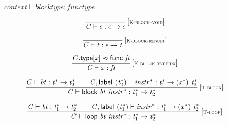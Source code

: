 \vspace{1ex}

$\boxed{{\mathit{context}} \vdash {\mathit{blocktype}} : {\mathit{functype}}}$

$$
\begin{array}{@{}c@{}}\displaystyle
\frac{
}{
{\mathit{C}} \vdash \epsilon : \epsilon \rightarrow \epsilon
} \, {[\textsc{\scriptsize K{-}block{-}void}]}
\qquad
\end{array}
$$

$$
\begin{array}{@{}c@{}}\displaystyle
\frac{
}{
{\mathit{C}} \vdash {\mathit{t}} : \epsilon \rightarrow {\mathit{t}}
} \, {[\textsc{\scriptsize K{-}block{-}result}]}
\qquad
\end{array}
$$

$$
\begin{array}{@{}c@{}}\displaystyle
\frac{
{\mathit{C}}.\mathsf{type}{}[{\mathit{x}}] \approx \mathsf{func}~{\mathit{ft}}
}{
{\mathit{C}} \vdash {\mathit{x}} : {\mathit{ft}}
} \, {[\textsc{\scriptsize K{-}block{-}typeidx}]}
\qquad
\end{array}
$$

\vspace{1ex}

$$
\begin{array}{@{}c@{}}\displaystyle
\frac{
{\mathit{C}} \vdash {\mathit{bt}} : {{\mathit{t}}_{{1}}^\ast} \rightarrow {{\mathit{t}}_{{2}}^\ast}
 \qquad
{\mathit{C}}, \mathsf{label}~({{\mathit{t}}_{{2}}^\ast}) \vdash {{\mathit{instr}}^\ast} : {{\mathit{t}}_{{1}}^\ast} \rightarrow ({{\mathit{x}}^\ast})~{{\mathit{t}}_{{2}}^\ast}
}{
{\mathit{C}} \vdash \mathsf{block}~{\mathit{bt}}~{{\mathit{instr}}^\ast} : {{\mathit{t}}_{{1}}^\ast} \rightarrow {{\mathit{t}}_{{2}}^\ast}
} \, {[\textsc{\scriptsize T{-}block}]}
\qquad
\end{array}
$$

$$
\begin{array}{@{}c@{}}\displaystyle
\frac{
{\mathit{C}} \vdash {\mathit{bt}} : {{\mathit{t}}_{{1}}^\ast} \rightarrow {{\mathit{t}}_{{2}}^\ast}
 \qquad
{\mathit{C}}, \mathsf{label}~({{\mathit{t}}_{{1}}^\ast}) \vdash {{\mathit{instr}}^\ast} : {{\mathit{t}}_{{1}}^\ast} \rightarrow ({{\mathit{x}}^\ast})~{{\mathit{t}}_{{2}}^\ast}
}{
{\mathit{C}} \vdash \mathsf{loop}~{\mathit{bt}}~{{\mathit{instr}}^\ast} : {{\mathit{t}}_{{1}}^\ast} \rightarrow {{\mathit{t}}_{{2}}^\ast}
} \, {[\textsc{\scriptsize T{-}loop}]}
\qquad
\end{array}
$$

